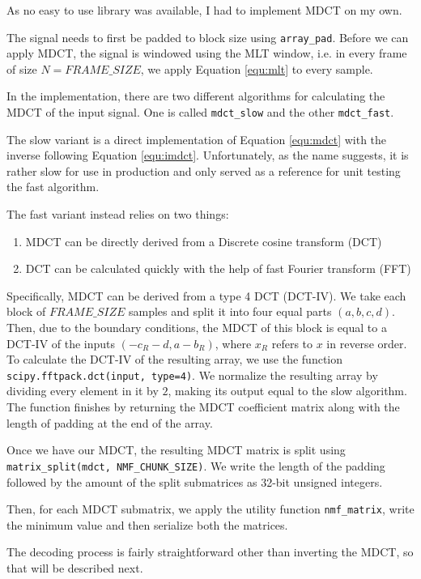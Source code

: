 As no easy to use library was available, I had to implement MDCT on my own.

The signal needs to first be padded to block size using \verb|array_pad|. Before we can apply MDCT, the signal is windowed using the MLT window, i.e. in every frame of size $N = FRAME\_SIZE$, we apply Equation \ref{equ:mlt} to every sample.

In the implementation, there are two different algorithms for calculating the MDCT of the input signal. One is called \verb|mdct_slow| and the other \verb|mdct_fast|.

The slow variant is a direct implementation of Equation \ref{equ:mdct} with the inverse following Equation \ref{equ:imdct}. Unfortunately, as the name suggests, it is rather slow for use in production and only served as a reference for unit testing the fast algorithm.

The fast variant instead relies on two things:

\begin{enumerate}
	\item MDCT can be directly derived from a Discrete cosine transform (DCT) \cite{Babu2013FastAE}
	\item DCT can be calculated quickly with the help of fast Fourier transform (FFT) \cite{makhoul_1980}
\end{enumerate}

Specifically, MDCT can be derived from a type 4 DCT (DCT-IV). We take each block of $FRAME\_SIZE$ samples and split it into four equal parts $(a, b, c, d)$. Then, due to the boundary conditions, the MDCT of this block is equal to a DCT-IV of the inputs $(-c_R-d, a-b_R)$, where $x_R$ refers to $x$ in reverse order. To calculate the DCT-IV of the resulting array, we use the function \verb|scipy.fftpack.dct(input, type=4)|. We normalize the resulting array by dividing every element in it by $2$, making its output equal to the slow algorithm. The function finishes by returning the MDCT coefficient matrix along with the length of padding at the end of the array.

Once we have our MDCT, the resulting MDCT matrix is split using \verb|matrix_split(mdct, NMF_CHUNK_SIZE)|. We write the length of the padding followed by the amount of the split submatrices as 32-bit unsigned integers.

Then, for each MDCT submatrix, we apply the utility function \verb|nmf_matrix|, write the minimum value and then serialize both the matrices.

The decoding process is fairly straightforward other than inverting the MDCT, so that will be described next.

